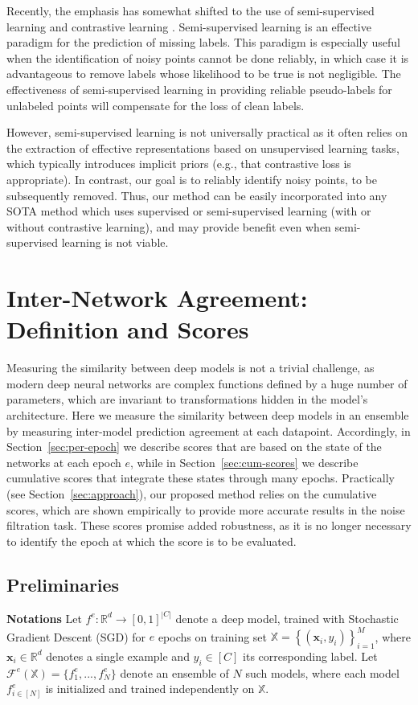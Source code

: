 \documentclass{article}
\newcommand{\bx}{\bm{x}}
\newcommand{\F}{\mathcal{F}}
\newcommand{\iX}{\mathbb{X}}
\newcommand{\myparagpar}[1]{\noindent\textbf{#1}}
\begin{document}
Recently, the emphasis has somewhat shifted to the use of semi-supervised learning and contrastive learning \citep{li2020dividemix,liu2020early,MOIT, JoCoR,JoSRC,zheltonozhskii2022contrast, Sel-CL,UNICON}. Semi-supervised learning is an effective paradigm for the prediction of missing labels. This paradigm is especially useful when the identification of noisy points cannot be done reliably, in which case it is advantageous to remove labels whose likelihood to be true is not negligible. The effectiveness of semi-supervised learning in providing reliable pseudo-labels for unlabeled points will compensate for the loss of clean labels. 

However, semi-supervised learning is not universally practical as it often relies on the extraction of effective representations based on unsupervised learning tasks, which typically introduces implicit priors (e.g., that contrastive loss is appropriate). In contrast, our goal is to reliably identify noisy points, to be subsequently removed. Thus, our method can be easily incorporated into any SOTA method which uses supervised or semi-supervised learning (with or without contrastive learning), and may provide benefit even when semi-supervised learning is not viable.

\section{Inter-Network Agreement: Definition and Scores}


Measuring the similarity between deep models is not a trivial challenge, as modern deep neural networks are complex functions defined by a huge number of parameters, which are invariant to transformations hidden in the model's architecture. Here we measure the similarity between deep models in an ensemble by measuring inter-model prediction agreement at each datapoint. Accordingly, in Section~\ref{sec:per-epoch} we describe scores that are based on the state of the networks at each epoch $e$, while in Section~\ref{sec:cum-scores} we describe cumulative scores that integrate these states through many epochs. Practically (see Section~\ref{sec:approach}), our proposed method relies on the cumulative scores, which are shown empirically to provide more accurate results in the noise filtration task. These scores promise added robustness, as it is no longer necessary to identify the epoch at which the score is to be evaluated.

\vspace{-.5em}
\subsection{Preliminaries}
%
\myparagpar{Notations} 
Let $f^e:\mathbb{R}^{d}\to {[0,1]}^{|C|}$ denote a deep model, trained with Stochastic Gradient Descent (SGD) for $e$ epochs on training set $\iX = \left\{(\bx_i,y_i)\right \}_{i=1}^M$, where $\bx_i\in\mathbb{R}^{d}$ denotes a single example and $y_i\in [C]$ its corresponding label. Let $\F^e(\iX)=\{f_1^e,...,f_{N}^e\}$ denote an ensemble of $N$ such models, where each model $f_{i\in [N]}^e$ is initialized and trained independently on $\iX$. %
\end{document}
